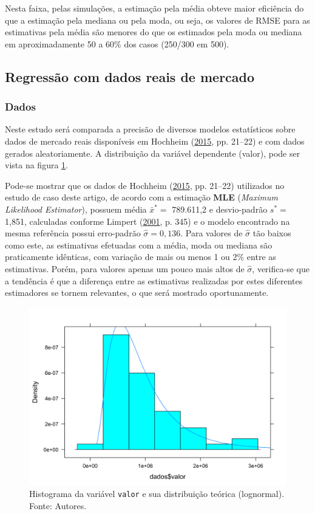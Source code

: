 \documentclass[a4paper, 12pt]{article}
\begin{document}
Nesta faixa, pelas simulações, a estimação pela média obteve maior
eficiência do que a estimação pela mediana ou pela moda, ou seja, os
valores de RMSE para as estimativas pela média são menores do que os
estimados pela moda ou mediana em aproximadamente 50 a 60\% dos casos
(250/300 em 500).

\newpage

\subsection{Regressão com dados reais de
mercado}\label{regressao-com-dados-reais-de-mercado}

\subsubsection{Dados}\label{dados}

Neste estudo será comparada a precisão de diversos modelos estatísticos
sobre dados de mercado reais disponíveis em Hochheim
(\protect\hyperlink{ref-hochheim}{2015}, pp. 21--22) e com dados gerados
aleatoriamente. A distribuição da variável dependente (valor), pode ser
vista na figura \ref{fig:hist}.

Pode-se mostrar que os dados de Hochheim
(\protect\hyperlink{ref-hochheim}{2015}, pp. 21--22) utilizados no
estudo de caso deste artigo, de acordo com a estimação \textbf{MLE}
(\emph{Maximum Likelihood Estimator}), possuem média \(\bar{x}^* =\)
789.611,2 e desvio-padrão \(s^* =\) 1,851, calculadas conforme Limpert
(\protect\hyperlink{ref-limpert}{2001}, p. 345) e o modelo encontrado na
mesma referência possui erro-padrão \(\hat{\sigma} = 0,136\). Para
valores de \(\hat{\sigma}\) tão baixos como este, as estimativas
efetuadas com a média, moda ou mediana são praticamente idênticas, com
variação de mais ou menos 1 ou 2\% entre as estimativas. Porém, para
valores apenas um pouco mais altos de \(\hat{\sigma}\), verifica-se que
a tendência é que a diferença entre as estimativas realizadas por estes
diferentes estimadores se tornem relevantes, o que será mostrado
oportunamente.

\begin{figure}[H]

{\centering \includegraphics[width=0.7\linewidth]{images/hist-1} 

}

\caption{Histograma da variável \texttt{valor} e sua distribuição teórica (lognormal). Fonte: Autores.}\label{fig:hist}
\end{figure}
\end{document}
